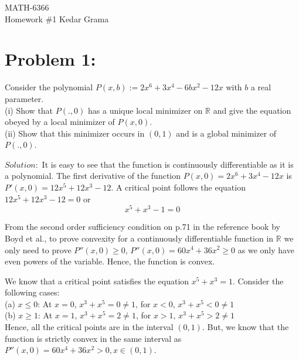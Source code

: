 \documentclass[12pt]{report}
\begin{document}
\begin{center}
	\large{MATH-6366}\\
	\hfill \hfill \hfill \large{Homework \#1} \hfill \large{Kedar Grama}\\
\end{center}

\section*{Problem 1:}Consider the polynomial $P (x, b) := 2 x^6 + 3 x^4 - 6 b x^2 - 12 x$ with $b$ a real parameter.\\
(i) Show that $P( . , 0)$ has a unique local minimizer on $ \mathbb{R} $ and give the equation obeyed by a local minimizer of $P (x, 0)$.\\
(ii) Show that this minimizer occurs in $(0, 1)$ and is a global minimizer of $P (., 0)$.

$Solution:$ It is easy to see that the function is continuously differentiable as it is a polynomial. The first derivative of the
function $P(x,0) = 2 x^6 + 3 x^4 - 12 x$ is $P'(x,0)=12 x^5 + 12 x^3 - 12$. A critical point follows the equation
$12 x^5 + 12 x^3 - 12 = 0 $ or 
\begin{equation}
x^5 + x^3 - 1 = 0
\end{equation}

From the second order sufficiency condition on p.71 in the reference book by Boyd et al., to prove convexity for a
continuously differentiable function in $\mathbb{R}$ we only need to prove $P''(x,0)\geq0$, $P''(x,0) = 60x^4+36x^2 \geq 0$ as we
only have even powers of the variable. Hence, the function is convex.

We know that a critical point satisfies the equation $x^5+x^3=1$. Consider the following cases:\\
(a) $x\leq 0$: At $x=0$, $x^3+x^5 = 0 \neq 1$, for $x<0$, $x^3+x^5<0 \neq 1$\\
(b) $x\geq 1$: At $x=1$, $x^3+x^5 = 2 \neq 1$, for $x>1$, $x^3+x^5>2 \neq 1$\\
Hence, all the critical points are in the interval $(0,1)$. But, we know that the function is strictly convex in the same interval as
$P''(x,0)=60x^4+36x^2>0, x \in (0,1)$.
\end{document}
